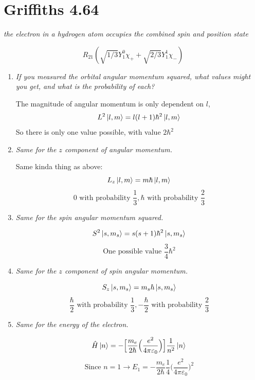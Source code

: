 \documentclass[12pt]{article}
\begin{document}
\newpage

\section*{Griffiths 4.64}
{\sl the electron in a hydrogen atom occupies the combined spin and position state}

\[R_{21}(\sqrt{1/3}Y^0_1 \chi_+ + \sqrt{2/3}Y^1_1 \chi_-)\]
\begin{enumerate}[label=\alph*)]
\item {\sl If you measured the orbital angular momentum squared, what values might you get, and what is the probability of each? }

The magnitude of angular momentum is only dependent on $l$, 
\[L^2 \ket{l,m} = l(l+1)\hbar^2 \ket{l,m}\]
So there is only one value possible, with value $\boxed{2\hbar^2}$

\item {\sl Same for the $z$ component of angular momentum.}

Same kinda thing as above:
\[L_z \ket{l,m} = m\hbar \ket{l,m}\]
\[\boxed{0 \text{ with probability } \frac{1}{3}, \hbar \text{ with probability } \frac{2}{3}}\]

\item {\sl Same for the spin angular momentum squared.}

\[S^2\ket{s, m_s} = s(s+1)\hbar^2 \ket{s, m_s}\]
\[\boxed{\text{One possible value } \frac{3}{4}\hbar^2}\]

\item {\sl Same for the $z$ component of spin angular momentum.}

\[S_z \ket{s, m_s} = m_s \hbar \ket{s, m_s}\]
\[\boxed{\frac{\hbar}{2} \text{ with probability } \frac{1}{3}, -\frac{\hbar}{2} \text{ with probability } \frac{2}{3}}\]

\item {\sl Same for the energy of the electron.}

\[\hat{H}\ket{n} = -\Big[\frac{m_e}{2\hbar}\Big(\frac{e^2}{4\pi \varepsilon_0}\Big)\Big]\frac{1}{n^2}\ket{n}\]
\[\text{Since } n=1\rightarrow \boxed{E_1 = -\frac{m_e}{2\hbar}\frac{1}{4}\Big(\frac{e^2}{4\pi\varepsilon_0}\Big)^2}\]

\end{enumerate}

\newpage
\end{document}
